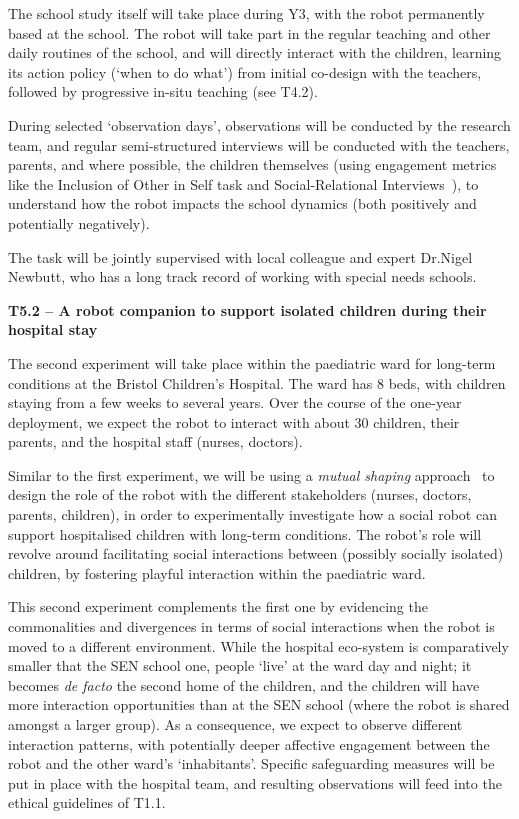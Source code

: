 \begin{rewrite}
The school study itself will take place during Y3, with the robot permanently
based at the school. The robot will take part in the
regular teaching and other daily routines of the school, and will directly
interact with the children, learning its action policy (`when to do what') from
initial co-design with the teachers, followed by progressive in-situ teaching (see
T4.2).

During selected `observation days', observations will be conducted by the
research team, and regular semi-structured interviews will be conducted with the
teachers, parents, and where possible, the children themselves (using engagement
metrics like the Inclusion of Other in Self task and Social-Relational
Interviews~\cite{westlund2017measuring}), to understand how the robot impacts
the school dynamics  (both positively and potentially negatively).

The task will be jointly supervised with local colleague and expert Dr.Nigel Newbutt,
who has a long track record of working with special needs schools.

\textbf{T5.2 -- A robot companion to support isolated children during their
hospital stay}

The second experiment will take place within the paediatric ward for long-term
conditions at the Bristol Children's Hospital. The ward has 8 beds, with
children staying from a few weeks to several years. Over the course of the
one-year deployment, we expect the robot to interact with about 30 children,
their parents, and the hospital staff (nurses, doctors).

Similar to the first experiment, we will be using a \emph{mutual shaping}
approach~\cite{winkle2018social} to design the role of the robot with the
different stakeholders (nurses, doctors, parents, children), in order to
experimentally investigate how a social robot can support hospitalised children
with long-term conditions. The robot's role will revolve around facilitating
social interactions between (possibly socially isolated) children, by fostering
playful interaction within the paediatric ward.

This second experiment complements the first one by evidencing the commonalities
and divergences in terms of social interactions when the robot is moved to a
different environment. While the hospital eco-system is comparatively smaller that the SEN school one,
people `live' at the ward day and night; it becomes \emph{de facto} the second home of the
children, and the children will have more interaction opportunities than at the
SEN school (where the robot is shared amongst a larger group). As a consequence,
we expect to observe different interaction patterns, with potentially deeper
affective engagement between the robot and the other ward's `inhabitants'.
Specific safeguarding measures will be put in place with the hospital team, and
resulting observations will feed into the ethical guidelines of T1.1.

\end{rewrite}


